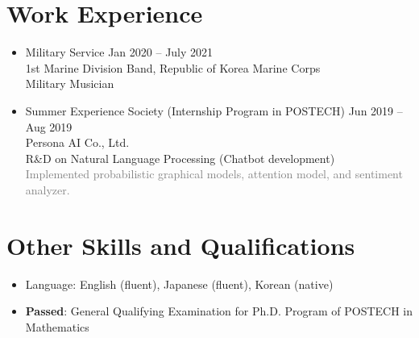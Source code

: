 \documentclass[11pt,a4paper]{article}
\begin{document}
\section*{Work Experience}
\begin{itemize}
\item
	Military Service
	\hfill{\small Jan 2020 -- July 2021}\\
	1st Marine Division Band, Republic of Korea Marine Corps\\
	Military Musician
\item
	Summer Experience Society (Internship Program in POSTECH)
	\hfill{\small Jun 2019 -- Aug 2019}\\
	Persona AI Co., Ltd.\\
	R\&D on Natural Language Processing (Chatbot development)\\
	\textcolor{gray}{Implemented probabilistic graphical models, attention model, and sentiment analyzer.}
\end{itemize}





\section*{Other Skills and Qualifications}
\begin{itemize}
\item Language: English (fluent), Japanese (fluent), Korean (native)
\item \textbf{Passed}: General Qualifying Examination for Ph.D. Program of POSTECH in Mathematics
\end{itemize}
	
\end{document}
